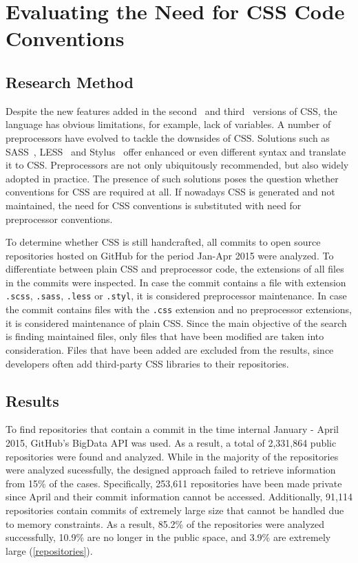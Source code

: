 \chapter{Evaluating the Need for CSS Code Conventions}
\label{sec:evaluating}

\section{Research Method}

Despite the new features added in the second~\cite{CSS2} and third~\cite{CSS3} versions of CSS, the
language has obvious limitations, for example, lack of variables. A number of preprocessors have
evolved to tackle the downsides of CSS. Solutions such as SASS~\cite{SASS}, LESS~\cite{LESS} and
Stylus~\cite{Stylus} offer enhanced or even different syntax and translate it to CSS. Preprocessors
are not only ubiquitously recommended, but also widely adopted in practice. The presence of such
solutions poses the question whether conventions for CSS are required at all. If nowadays CSS is
generated and not maintained, the need for CSS conventions is substituted with need for preprocessor conventions.

To determine whether CSS is still handcrafted, all commits to open source repositories hosted on
GitHub for the period Jan-Apr 2015 were analyzed. To differentiate between plain CSS and
preprocessor code, the extensions of all files in the commits were inspected. In case the commit
contains a file with extension \texttt{.scss}, \texttt{.sass}, \texttt{.less} or \texttt{.styl}, it
is considered preprocessor maintenance. In case the commit contains files with the \texttt{.css}
extension and no preprocessor extensions, it is considered maintenance of plain CSS. Since the main
objective of the search is finding maintained files, only files that have been modified are taken
into consideration. Files that have been added are excluded from the results, since developers often
add third-party CSS libraries to their repositories.


\section{Results}

To find repositories that contain a commit in the time internal January -
April 2015, GitHub's BigData API was used. As a result, a total of 2,331,864
public repositories were found and analyzed. While in the majority of the
repositories were analyzed sucessfully, the designed approach failed to
retrieve information from 15\% of the cases. Specifically, 253,611
repositories have been made private since April and their commit information
cannot be accessed. Additionally, 91,114 repositories contain commits of
extremely large size that cannot be handled due to memory constraints. As a
result, 85.2\% of the repositories were analyzed successfully, 10.9\% are no
longer in the public space, and 3.9\% are extremely large
(\autoref{repositories}).

